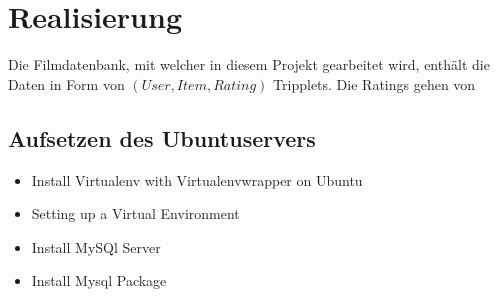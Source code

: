 \chapter{Realisierung}
Die Filmdatenbank, mit welcher in diesem Projekt gearbeitet wird, enthält die Daten in Form von $(User, Item, Rating)$ Tripplets. Die Ratings gehen von

\section{Aufsetzen des Ubuntuservers}
\begin{itemize}
    \item Install Virtualenv with Virtualenvwrapper on Ubuntu
    \item Setting up a Virtual Environment
    \item Install MySQl Server
    \item Install Mysql Package
\end{itemize}

